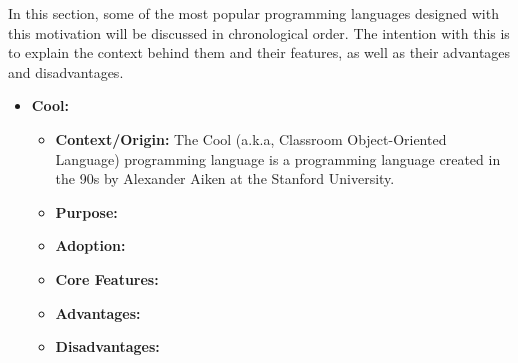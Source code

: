 In this section, some of the most popular programming languages designed with this motivation will be discussed in chronological order. The intention with this is to explain the context behind them and their features, as well as their advantages and disadvantages.

\begin{itemize}
    \item \textbf{Cool:}
    \begin{itemize}
        \item \textbf{Context/Origin:} The Cool (a.k.a, Classroom Object-Oriented Language) programming language \cite{aiken1996cool} is a programming language created in the 90s by Alexander Aiken at the Stanford University. 
        \item \textbf{Purpose:}
        \item \textbf{Adoption:}
        \item \textbf{Core Features:}
        \item \textbf{Advantages:}
        \item \textbf{Disadvantages:}
    \end{itemize}


\end{itemize}
